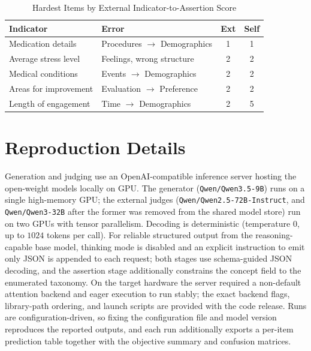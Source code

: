 \documentclass[onecolumn, 11pt]{IEEEtran}
\begin{document}
\begin{table}[ht]
\caption{Hardest Items by External Indicator-to-Assertion Score}
\label{tab:worst}
\centering
\footnotesize
\begin{tabular}{l l c c}
\hline
\textbf{Indicator} & \textbf{Error} & \textbf{Ext} & \textbf{Self} \\
\hline
Medication details & Procedures $\to$ Demographics & 1 & 1 \\
Average stress level & Feelings, wrong structure & 2 & 2 \\
Medical conditions & Events $\to$ Demographics & 2 & 2 \\
Areas for improvement & Evaluation $\to$ Preference & 2 & 2 \\
Length of engagement & Time $\to$ Demographics & 2 & 5 \\
\hline
\end{tabular}
\end{table}

\FloatBarrier
\section{Reproduction Details}
\label{app:repro}
Generation and judging use an OpenAI-compatible inference server hosting the open-weight models locally on GPU. The generator (\texttt{Qwen/Qwen3.5-9B}) runs on a single high-memory GPU; the external judges (\texttt{Qwen/Qwen2.5-72B-Instruct}, and \texttt{Qwen/Qwen3-32B} after the former was removed from the shared model store) run on two GPUs with tensor parallelism. Decoding is deterministic (temperature $0$, up to $1024$ tokens per call). For reliable structured output from the reasoning-capable base model, thinking mode is disabled and an explicit instruction to emit only JSON is appended to each request; both stages use schema-guided JSON decoding, and the assertion stage additionally constrains the concept field to the enumerated taxonomy. On the target hardware the server required a non-default attention backend and eager execution to run stably; the exact backend flags, library-path ordering, and launch scripts are provided with the code release. Runs are configuration-driven, so fixing the configuration file and model version reproduces the reported outputs, and each run additionally exports a per-item prediction table together with the objective summary and confusion matrices.



\FloatBarrier


\end{document}
